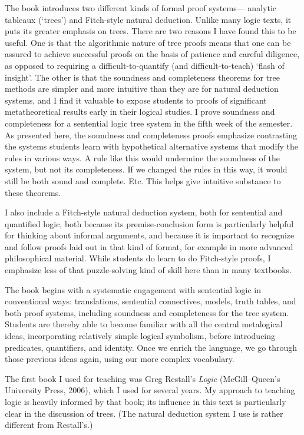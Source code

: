The book introduces two different kinds of formal proof systems--- analytic tableaux (`trees') and Fitch-style natural deduction. Unlike many logic texts, it puts its greater emphasis on trees. There are two reasons I have found this to be useful. One is that the algorithmic nature of tree proofs means that one can be assured to achieve successful proofs on the basis of patience and careful diligence, as opposed to requiring a difficult-to-quantify (and difficult-to-teach) `flash of insight'. The other is that the soundness and completeness theorems for tree methods are simpler and more intuitive than they are for natural deduction systems, and I find it valuable to expose students to proofs of significant metatheoretical results early in their logical studies. I prove soundness and completeness for a sentential logic tree system in the fifth week of the semester. As presented here, the soundness and completeness proofs emphasize contrasting the systems students learn with hypothetical alternative systems that modify the rules in various ways. A rule like this would undermine the soundness of the system, but not its completeness. If we changed the rules in this way, it would still be both sound and complete. Etc. This helps give intuitive substance to these theorems.

I also include a Fitch-style natural deduction system, both for sentential and quantified logic, both because its premise-conclusion form is particularly helpful for thinking about informal arguments, and because it is important to recognize and follow proofs laid out in that kind of format, for example in more advanced philosophical material. While students do learn to do Fitch-style proofs, I emphasize less of that puzzle-solving kind of skill here than in many textbooks.

The book begins with a systematic engagement with sentential logic in conventional ways: translations, sentential connectives, models, truth tables, and both proof systems, including soundness and completeness for the tree system. Students are thereby able to become familiar with all the central metalogical ideas, incorporating relatively simple logical symbolism, before introducing predicates, quantifiers, and identity. Once we enrich the language, we go through those previous ideas again, using our more complex vocabulary.

The first book I used for teaching was Greg Restall's \emph{Logic} (McGill--Queen's University Press, 2006), which I used for several years. My approach to teaching logic is heavily informed by that book; its influence in this text is particularly clear in the discussion of trees. (The natural deduction system I use is rather different from Restall's.)

